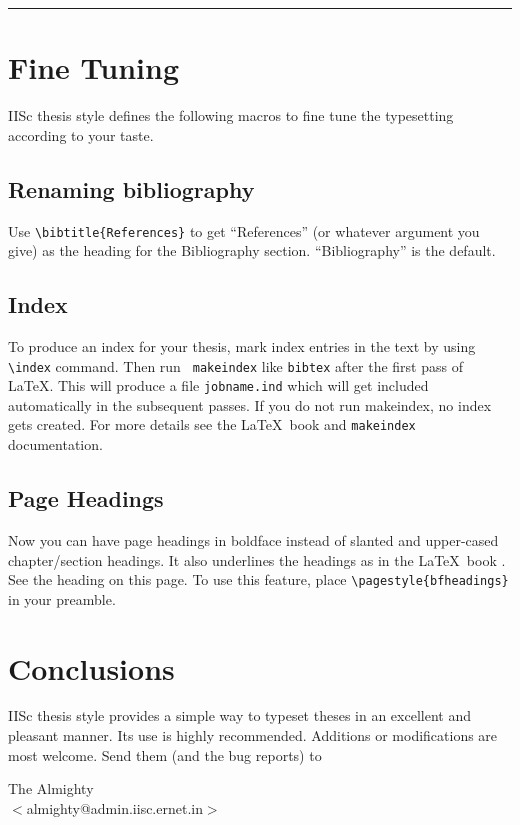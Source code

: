 \documentclass[12pt]{iiscthes}
\begin{document}
\medskip
\hrule
\bigskip


\chapter{Fine Tuning}

	IISc thesis  style defines the following  macros  to fine  tune the
typesetting according to your taste.

\section{Renaming bibliography}
	Use  \verb|\bibtitle{References}| to   get ``References''   (or
whatever  argument  you  give)  as the  heading  for the  Bibliography
section. ``Bibliography'' is the default.

\section{Index}
	To produce  an index for  your thesis,  mark   index
entries in  the text by  using  \verb|\index| command.  Then run  {\tt
makeindex} like {\tt bibtex} after the first pass of \LaTeX. This will
produce a file {\tt jobname.ind} which will get included automatically
in the subsequent passes.  If you do not run makeindex,  no index gets
created.  For more details see the \LaTeX\ book \cite{latex}and  {\tt makeindex}
documentation.

\section{Page Headings}
	Now you can     have page  headings  in
boldface instead of slanted  and upper-cased chapter/section headings.  It
also underlines the headings as  in the \LaTeX\ book \cite{latex}.  See the heading
on  this  page. To use  this feature, place \verb|\pagestyle{bfheadings}| in your
preamble.

\chapter{Conclusions}
  IISc thesis style provides a simple way to typeset 
theses in an excellent and pleasant manner. Its use is highly recommended. 
Additions or modifications are most welcome. Send them (and the bug reports) to 
\begin{center}
The Almighty\\
$<$almighty@admin.iisc.ernet.in$>$
\end{center}
\end{document}
